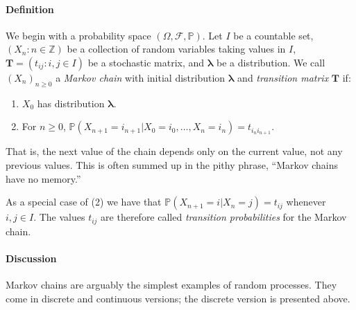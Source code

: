 \documentclass[12pt]{article}
\newcommand{\mv}[1]{\mathbf{#1}}	%
\newcommand{\integers}{\mathbb{Z}}
\begin{document}
\paragraph{Definition}
We begin with a probability space $(\Omega, \mathcal{F}, \mathbb{P})$.  Let $I$ be a countable set, $(X_n: n \in \integers)$ be a collection of random variables taking values in $I$, $\mv{T} = (t_{ij}: i,j \in I)$ be a stochastic matrix, and $\mv{\lambda}$ be a distribution.  We call $(X_n)_{n\ge 0}$ a \emph{Markov chain} with initial distribution $\mv{\lambda}$ and \emph{transition matrix} $\mv{T}$ if:

\begin{enumerate}
\item{$X_0$ has distribution $\mv{\lambda}$.}
\item{For $n \ge 0$, $\mathbb{P}(X_{n+1}=i_{n+1} | X_0 = i_0, \ldots, X_n = i_n) = t_{i_n i_{n+1}}$.}
\end{enumerate}

That is, the next value of the chain depends only on the current value, not any previous values.  This is often summed up in the pithy phrase, ``Markov chains have no memory.''

As a special case of (2) we have that $\mathbb{P}(X_{n+1} = i | X_n = j) = t_{ij}$ whenever $i,j \in I$. The values $t_{ij}$ are therefore called 
\emph{transition probabilities} for the Markov chain.

\paragraph{Discussion}
Markov chains are arguably the simplest examples of random processes.  They come in discrete and continuous versions; the discrete version is presented above.
\end{document}
